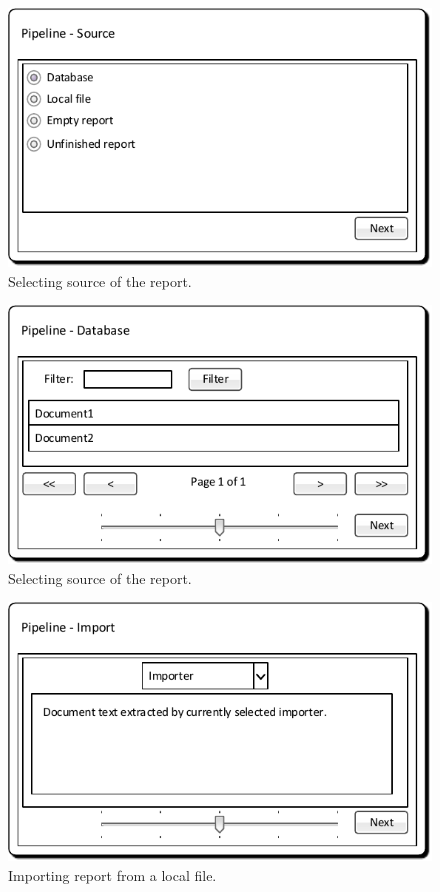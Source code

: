 \begin{figure}[!htb]
        \centering
        \includegraphics{Images/MockupPipelineSource}
        \caption{Selecting source of the report.}
        \label{fig:MockupPipelineSource}
\end{figure}

\begin{figure}[!htb]
        \centering
        \includegraphics{Images/MockupPipelineDatabase}
        \caption{Selecting source of the report.}
        \label{fig:MockupPipelineDatabase}
\end{figure}

\begin{figure}[!htb]
        \centering
        \includegraphics{Images/MockupPipelineImport}
        \caption{Importing report from a local file.}
        \label{fig:MockupPipelineImport}
\end{figure}

